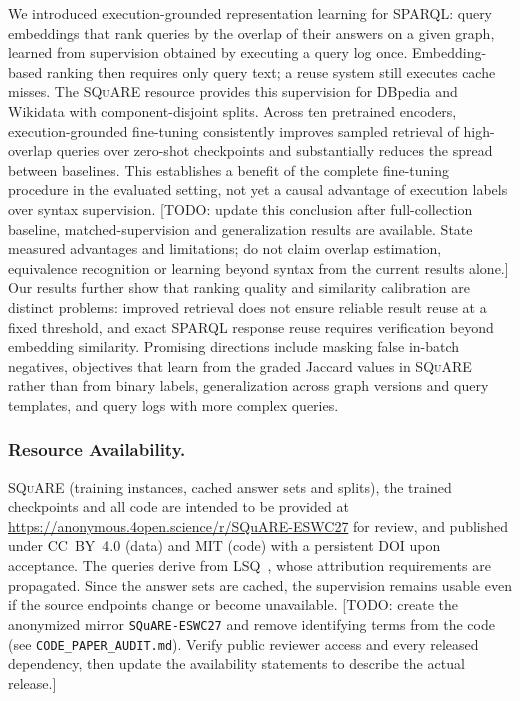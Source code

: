 \documentclass[runningheads]{llncs}
\newcommand{\squareds}{\textsc{SQuARE}}
\newcommand{\hp}[1]{{\color{red!75!black}#1}}
\begin{document}
We introduced execution-grounded representation learning for SPARQL: query
embeddings that rank queries by the overlap of their answers on a given graph,
learned
from supervision obtained by executing a query log once. Embedding-based
ranking then requires only query text; a reuse system still executes cache
misses. The \squareds{} resource provides this
supervision for DBpedia and Wikidata with component-disjoint splits. Across
ten pretrained encoders, execution-grounded fine-tuning consistently improves
sampled retrieval of high-overlap queries over zero-shot checkpoints and
substantially reduces the spread between baselines. This establishes a
benefit of the complete fine-tuning procedure in the evaluated setting,
not yet a causal advantage of execution labels over syntax supervision.
\hp{[TODO: update this conclusion after full-collection baseline,
matched-supervision and generalization results are available. State measured
advantages and limitations; do not claim overlap estimation, equivalence
recognition or learning beyond syntax from the current results alone.]} Our results further show that ranking quality and
similarity calibration are distinct problems: improved retrieval does not
ensure reliable result reuse at a fixed threshold, and exact SPARQL response
reuse requires verification beyond embedding similarity.
Promising directions include masking false in-batch negatives, objectives
that learn from the graded Jaccard
values in \squareds{} rather than from binary labels, generalization across
graph versions and query templates, and query logs with more complex queries.

\subsubsection*{Resource Availability.}
\label{sec:availability}
\squareds{} (training instances, cached answer sets and splits), the trained checkpoints
and all code are intended to be provided at
\url{https://anonymous.4open.science/r/SQuARE-ESWC27} for review, and
published under CC~BY~4.0 (data) and MIT (code) with a persistent DOI upon
acceptance. The queries derive from LSQ~\cite{saleem2015lsq}, whose
attribution requirements are propagated. Since the answer sets are cached,
the supervision remains usable even if the source endpoints change or become
unavailable.
\hp{[TODO: create the anonymized mirror \texttt{SQuARE-ESWC27} and remove
identifying terms from the code (see \texttt{CODE\_PAPER\_AUDIT.md}). Verify
public reviewer access and every released dependency, then update the
availability statements to describe the actual release.]}
\end{document}
